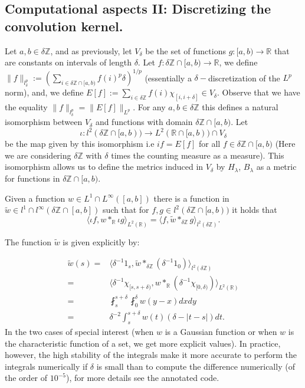 \subsection{Computational aspects II: Discretizing the convolution kernel.}
Let $a,b\in \delta\mathbb{Z}$, and
as previously, let $V_\delta$ be the set of functions $g:[a,b)\to\mathbb{R}$ that are constants on intervals of length $\delta$.
Let $f:\delta \mathbb Z\cap [a,b)\to\mathbb{R}$, we define $\|f\|_{l^p_\delta}:= \left (\sum_{i\in\delta\mathbb Z\cap[a,b)} f(i)^p \delta\right )^{1/p}$ (essentially a $\delta-$discretization of the $L^p$ norm), and, we define $E[f]:=\sum_{i\in\delta\mathbb Z} f(i)\chi_{[i,i+\delta]}\in V_{\delta}$. Observe that we have the equality $\|f\|_{l^p_\delta} = \|E[f]\|_{L^p}$. For any $a,b\in \delta \mathbb Z$ this defines a natural isomorphism between $V_{\delta}$ and functions with domain $\delta \mathbb Z \cap [a,b)$. Let
$$
\iota :l^2(\delta \mathbb Z \cap [a,b)) \to L^2(\mathbb R \cap [a,b))\cap V_{\delta}
$$ be the map given by this isomorphism i.e $if=E[f]$ for all $f\in \delta\mathbb{Z}\cap[a,b)$ 
(Here we are considering $\delta \mathbb Z$ with $\delta$ times the counting measure as a measure). This isomorphism allows us to define the metrics induced in $V_{\delta}$ by  %
$H_\lambda$, $B_\lambda$ as a metric for functions in $\delta \mathbb Z \cap [a,b)$. %


Given a function $w \in L^1 \cap L^{\infty} (
[a,b])$ there is a function in $\tilde w \in l^1 \cap l^{\infty} (\delta \mathbb Z \cap [a,b])$ such that for $f,g \in l^2(\delta \mathbb Z \cap [a,b))$ it holds that $$\langle  \iota f, w\ast_{\mathbb R} \iota g \rangle_{L^2(\mathbb R)} =  \langle  f, \tilde w\ast_{\delta \mathbb Z}  g \rangle_{l^2(\delta \mathbb Z)}. $$

The function $\tilde w$ is given explicitly by:

\begin{align*}
\tilde w(s) 
=&
\langle \delta^{-1} 1_s, \tilde w\ast_{\delta \mathbb Z} (\delta^{-1} 1_{0}) \rangle_{l^2(\delta \mathbb Z)} 
\\=&
\langle \delta^{-1} \chi_{[s,s+\delta)},  w\ast_{ \mathbb R} (\delta^{-1} \chi_{[0,\delta)}) \rangle_{L^2(\mathbb R)} 
\\=&
\fint_{s}^{s+\delta}\fint_{0}^{\delta} w(y-x)  dx dy
\\=&
\delta^{-2} \int_{s}^{s+\delta} w(t) (\delta-|t-s|) dt.
\end{align*}
In the two cases of special interest (when $w$ is a Gaussian function or when $w$ is the characteristic function of a set, we get more explicit values). In practice, however, the high stability of the integrals make it more accurate to perform the integrals numerically if $\delta$ is small than to compute the difference numerically (of the order of $10^{-5}$), for more details see the annotated code.



